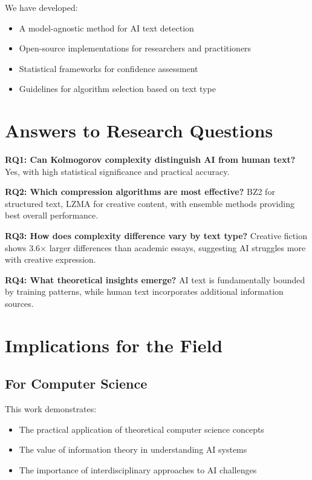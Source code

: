 \documentclass[12pt,a4paper]{report}
\begin{document}
We have developed:
\begin{itemize}
    \item A model-agnostic method for AI text detection
    \item Open-source implementations for researchers and practitioners
    \item Statistical frameworks for confidence assessment
    \item Guidelines for algorithm selection based on text type
\end{itemize}

\section{Answers to Research Questions}

\textbf{RQ1: Can Kolmogorov complexity distinguish AI from human text?}
Yes, with high statistical significance and practical accuracy.

\textbf{RQ2: Which compression algorithms are most effective?}
BZ2 for structured text, LZMA for creative content, with ensemble methods providing best overall performance.

\textbf{RQ3: How does complexity difference vary by text type?}
Creative fiction shows 3.6× larger differences than academic essays, suggesting AI struggles more with creative expression.

\textbf{RQ4: What theoretical insights emerge?}
AI text is fundamentally bounded by training patterns, while human text incorporates additional information sources.

\section{Implications for the Field}

\subsection{For Computer Science}

This work demonstrates:
\begin{itemize}
    \item The practical application of theoretical computer science concepts
    \item The value of information theory in understanding AI systems
    \item The importance of interdisciplinary approaches to AI challenges
\end{itemize}
\end{document}
